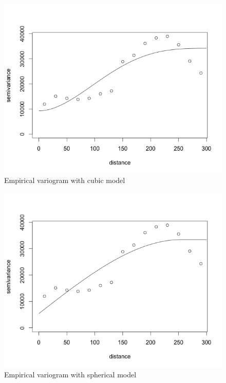 \documentclass[12pt,twoside]{reedthesis}
\begin{document}
\begin{figure}[h]
	   
	       \centering
	  
	    \includegraphics[scale=0.5]{vario_cubic}
	
	     \caption{Empirical variogram with cubic model}
	 \label{cubic}
	\end{figure}
	
\begin{figure}[h]
	   
	       \centering
	  
	    \includegraphics[scale=0.5]{vario_spherical}
	
	     \caption{Empirical variogram with spherical model}
	 \label{sph}
	\end{figure}
	
\end{document}
